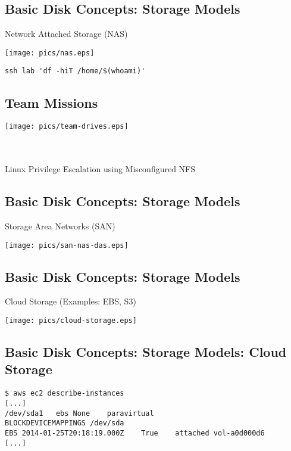 \documentclass[xga]{xdvislides}
\begin{document}
\subsection{Basic Disk Concepts: Storage Models}
Network Attached Storage (NAS)
\vfill
\begin{center}
	\texttt{[image: pics/nas.eps]} \\
\end{center}
\verb+ssh lab 'df -hiT /home/$(whoami)'+
\vfill

\subsection{Team Missions}
\vfill
\begin{center}
	\texttt{[image: pics/team-drives.eps]} \\
\end{center}
\hspace*{\fill}{\bf \textcolor{red}{Red Team}} \\
\hspace*{\fill}{\tt https://is.gd/cmjmWu} \\
\hspace*{\fill}Linux Privilege Escalation using Misconfigured NFS
\vfill

\subsection{Basic Disk Concepts: Storage Models}
Storage Area Networks (SAN)
\vfill
\begin{center}
	\texttt{[image: pics/san-nas-das.eps]} \\
\end{center}
\vfill

\subsection{Basic Disk Concepts: Storage Models}
Cloud Storage (Examples: EBS, S3)
\vfill
\begin{center}
	\texttt{[image: pics/cloud-storage.eps]} \\
\end{center}
\vfill

\subsection{Basic Disk Concepts: Storage Models: Cloud Storage}
\begin{verbatim}
$ aws ec2 describe-instances
[...]
/dev/sda1	ebs	None	paravirtual
BLOCKDEVICEMAPPINGS	/dev/sda
EBS	2014-01-25T20:18:19.000Z	True	attached vol-a0d000d6
[...]
\end{verbatim}
\end{document}
